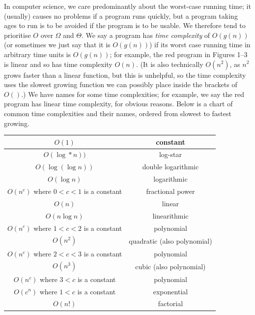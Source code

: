 \documentclass[10pt,a4paper]{article}
\begin{document}
\begin{multicols}{2}
	In computer science, we care predominantly about the worst-case running time; it (usually) causes no problems if a program runs quickly, but a program taking ages to run is to be avoided if the program is to be usable. We therefore tend to prioritise \(O\) over \(\Omega\) and \(\Theta\). We say a program has \textit{time complexity} of \(O(g(n))\) (or sometimes we just say that it is \(O(g(n))\)) if its worst case running time in arbitrary time units is \(O(g(n))\); for example, the red program in Figures 1--3 is linear and so has time complexity \(O(n)\). (It is also technically \(O(n^2)\), as \(n^2\) grows faster than a linear function, but this is unhelpful, so the time complexity uses the slowest growing function we can possibly place inside the brackets of \(O()\).) We have names for some time complexities; for example, we say the red program has linear time complexity, for obvious reasons. Below is a chart of common time complexities and their names, ordered from slowest to fastest growing.
	
\end{multicols}

\begin{center}
	\begin{tabular}{c|c}
		\(O(1)\)&constant\\\hline
		\(O(\log*n))\)&log-star\footnotemark\\\hline
		\(O(\log(\log{}n))\)&double logarithmic\\\hline
		\(O(\log{}n)\)&logarithmic\\\hline
		\(O(n^c)\) where \(0<c<1\) is a constant&fractional power\\\hline
		\(O(n)\)&linear\\\hline
		\(O(n\log{}n)\)&linearithmic\\\hline
		\(O(n^c)\) where \(1<c<2\) is a constant&polynomial\\\hline
		\(O(n^2)\)&quadratic (also polynomial)\\\hline
		\(O(n^c)\) where \(2<c<3\) is a constant&polynomial\\\hline
		\(O(n^3)\)&cubic (also polynomial)\\\hline
		\(O(n^c)\) where \(3<c\) is a constant&polynomial\\\hline
		\(O(c^n)\) where \(1<c\) is a constant&exponential\\\hline
		\(O(n!)\)&factorial
	\end{tabular}
\end{center}
\end{document}
